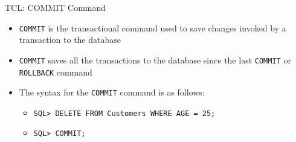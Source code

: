 \documentclass[aspectratio=169, xcolor=dvipsnames]{beamer}
\begin{document}
\begin{frame}[fragile]{TCL: COMMIT Command}
    \begin{itemize}[<+->]
        \item \texttt{COMMIT} is the transactional command used to save changes invoked by a transaction to the database
        \item \texttt{COMMIT} saves all the transactions to the database since the last \texttt{COMMIT} or \texttt{ROLLBACK} command
        \item The syntax for the \texttt{COMMIT} command is as follows:
        \begin{itemize}
            \item \texttt{SQL> DELETE FROM Customers WHERE AGE = 25;}
            \item \texttt{SQL> COMMIT;}
        \end{itemize}
    \end{itemize}
    \vspace{0.5em}
\end{frame}
\end{document}

